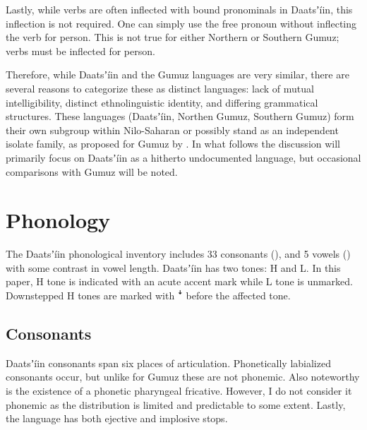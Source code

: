 \documentclass[output=paper]{langsci/langscibook}
\begin{document}
Lastly, while verbs are often inflected with bound pronominals in Daatsʼíin, this inflection is not required. One can simply use the free pronoun without inflecting the verb for person. This is not true for either Northern or Southern Gumuz; verbs must be inflected for person.

Therefore, while Daatsʼíin and the Gumuz languages are very similar, there are several reasons to categorize these as distinct languages: lack of mutual intelligibility, distinct ethnolinguistic identity, and differing grammatical structures. These languages (Daatsʼíin, Northen Gumuz, Southern Gumuz) form their own subgroup within Nilo-Saharan or possibly stand as an independent isolate family, as proposed for Gumuz by \citet{Dimmendaal2011}. In what follows the discussion will primarily focus on Daatsʼíin as a hitherto undocumented language, but occasional comparisons with Gumuz will be noted.


\section{Phonology}\label{sec:ahlandc:3}


The Daatsʼíin phonological inventory includes 33 consonants (), and 5 vowels () with some contrast in vowel length. Daatsʼíin has two tones: H and L. In this paper, H tone is indicated with an acute accent mark while L tone is unmarked. Downstepped H tones are marked with \textsf{ꜜ }before the affected tone.


\subsection{Consonants}\label{sec:ahlandc:3.1}

Daatsʼíin consonants span six places of articulation. Phonetically labialized consonants occur, but unlike for Gumuz these are not phonemic. Also noteworthy is the existence of a phonetic pharyngeal fricative. However, I do not consider it phonemic as the distribution is limited and predictable to some extent. Lastly, the language has both ejective and implosive stops.  
\end{document}

